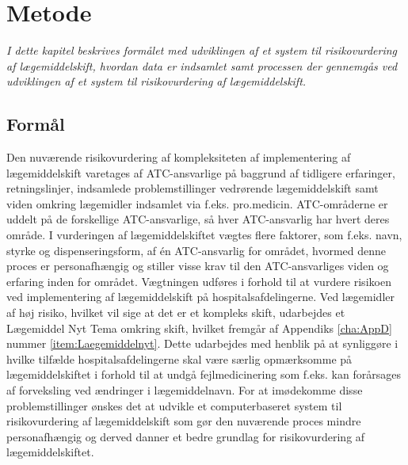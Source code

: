 \chapter{Metode}
\textit{I dette kapitel beskrives formålet med udviklingen af et system til risikovurdering af lægemiddelskift, hvordan data er indsamlet samt processen der gennemgås ved udviklingen af et system til risikovurdering af lægemiddelskift.}

\section{Formål}
Den nuværende risikovurdering af kompleksiteten af implementering af lægemiddelskift varetages af ATC-ansvarlige på baggrund af tidligere erfaringer, retningslinjer, indsamlede problemstillinger vedrørende lægemiddelskift samt viden omkring lægemidler indsamlet via f.eks. pro.medicin. ATC-områderne er uddelt på de forskellige ATC-ansvarlige, så hver ATC-ansvarlig har hvert deres område. I vurderingen af lægemiddelskiftet vægtes flere faktorer, som f.eks. navn, styrke og dispenseringsform, af én ATC-ansvarlig for området, hvormed denne proces er personafhængig og stiller visse krav til den ATC-ansvarliges viden og erfaring inden for området. Vægtningen udføres i forhold til at vurdere risikoen ved implementering af lægemiddelskift på hospitalsafdelingerne. Ved lægemidler af høj risiko, hvilket vil sige at det er et kompleks skift, udarbejdes et Lægemiddel Nyt Tema omkring skift, hvilket fremgår af Appendiks \ref{cha:AppD} nummer \ref{item:Laegemiddelnyt}. Dette udarbejdes med henblik på at synliggøre i hvilke tilfælde hospitalsafdelingerne skal være særlig opmærksomme på lægemiddelskiftet i forhold til at undgå fejlmedicinering som f.eks. kan forårsages af forveksling ved ændringer i lægemiddelnavn.
For at imødekomme disse problemstillinger ønskes det at udvikle et computerbaseret system til risikovurdering af lægemiddelskift som gør den nuværende proces mindre personafhængig og derved danner et bedre grundlag for risikovurdering af lægemiddelskiftet. 



